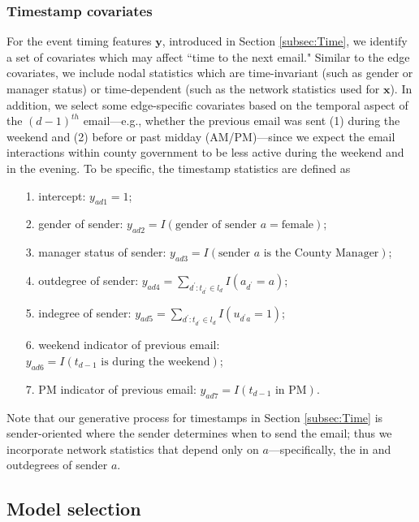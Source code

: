 \documentclass[ba]{imsart}
\numberwithin{equation}{section}
\theoremstyle{plain}
\begin{document}
	\subsubsection{Timestamp covariates}
	For the event timing features $\boldsymbol{y}$, introduced in Section \ref{subsec:Time}, we identify a set of covariates which may affect ``time to the next email." Similar to the edge covariates, we include nodal statistics which are time-invariant (such as gender or manager status) or time-dependent (such as the network statistics used for $\boldsymbol{x}$). In addition, we select some edge-specific covariates based on the temporal aspect of the $(d-1)^{th}$ email---e.g., whether the previous email was sent (1) during the weekend and (2) before or past midday (AM/PM)---since we expect the email interactions within county government to be less active during the weekend and in the evening. To be specific, the timestamp statistics are defined as
	\begin{itemize}
		\item[1.] intercept: ${y}_{ad1} =1$;
		\item[2.] gender of sender: ${y}_{ad2}=I(\mbox{gender of sender }a= \mbox{female})$;
		\item[3.] manager status of sender: ${y}_{ad3}=I(\mbox{sender }a \mbox{ is the County Manager})$;
		\item[4.] outdegree of sender: ${y}_{ad4} =\sum_{d^\prime: t_{d^\prime} \in l_d} I(a_{d^\prime} = a)$;
		\item[5.] indegree of sender: ${y}_{ad5}=\sum_{d^\prime: t_{d^\prime} \in l_d} I(u_{d^\prime a} = 1)$;
		\item[6.] weekend indicator of previous email: ${y}_{ad6} = I(t_{d-1} \mbox{ is during the } \mbox{weekend})$;
		\item[7.] PM indicator of previous email: ${y}_{ad7}= I(t_{d-1} \mbox{ in } \mbox{PM})$.
	\end{itemize}
	Note that our generative process for timestamps in Section \ref{subsec:Time} is sender-oriented where the sender determines when to send the email; thus we incorporate network statistics that depend only on $a$---specifically, the in and outdegrees of sender $a$. 
	
	\subsection{Model selection}\label{subsec:Experiment_email}
	
\end{document}
